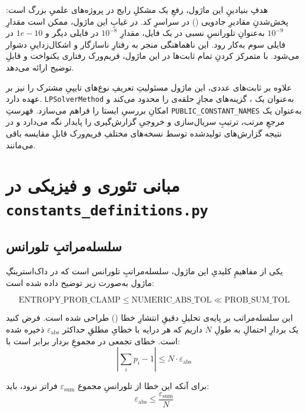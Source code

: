 هدفِ بنیادینِ این ماژول، رفعِ یک مشکلِ رایج در پروژه‌های علمیِ بزرگ است: پخش‌شدنِ مقادیرِ جادویی () در سراسرِ کد. در غیابِ این ماژول، ممکن است مقدارِ $10^{-9}$ به‌عنوانِ تلورانسِ نسبی در یک فایل، مقدارِ $10^{-8}$ در فایلی دیگر و $1e-10$ در فایلی سوم به‌کار رود. این ناهماهنگی منجر به رفتارِ ناسازگار و اشکال‌زداییِ دشوار می‌شود. با متمرکز کردنِ تمام ثابت‌ها در این ماژول، فریم‌ورک رفتاری یکنواخت و قابلِ توضیح ارائه می‌دهد.

علاوه بر ثابت‌های عددی، این ماژول مسئولیتِ تعریفِ نوع‌های تایپیِ مشترک را نیز بر عهده دارد. \texttt{LPSolverMethod} به‌عنوان یک ، گزینه‌های مجازِ حلقه‌ی  را محدود می‌کند و امکانِ بررسیِ ایستا را فراهم می‌سازد. فهرستِ \texttt{PUBLIC\_CONSTANT\_NAMES} به‌عنوان یک مرجعِ مرتب، ترتیبِ سریال‌سازی و خروجیِ گزارش‌گیری را پایدار نگه می‌دارد و در نتیجه گزارش‌های تولیدشده توسط نسخه‌های مختلفِ فریم‌ورک قابلِ مقایسه باقی می‌مانند.

\section{مبانی تئوری و فیزیکی در \texttt{constants\_definitions.py}}

\subsection{سلسله‌مراتبِ تلورانس}

یکی از مفاهیمِ کلیدیِ این ماژول، سلسله‌مراتبِ تلورانس است که در داک‌استرینگِ ماژول به‌صورت زیر توضیح داده شده است:

\begin{equation}
	\text{ENTROPY\_PROB\_CLAMP} \leq \text{NUMERIC\_ABS\_TOL} \ll \text{PROB\_SUM\_TOL}
\end{equation}

این سلسله‌مراتب بر پایه‌ی تحلیلِ دقیقِ انتشارِ خطا () طراحی شده است. فرض کنید یک بردارِ احتمالِ به طولِ $N$ داریم که هر درایه با خطایِ مطلقِ حداکثر $\varepsilon_{\text{abs}}$ ذخیره شده است. خطای تجمعی در مجموعِ بردار برابر است با:
\begin{equation}
	\left| \sum_i p_i - 1 \right| \leq N \cdot \varepsilon_{\text{abs}}
\end{equation}

برای آنکه این خطا از تلورانسِ مجموع $\varepsilon_{\text{sum}}$ فراتر نرود، باید:
\begin{equation}
	\varepsilon_{\text{abs}} \leq \frac{\varepsilon_{\text{sum}}}{N}
\end{equation}

